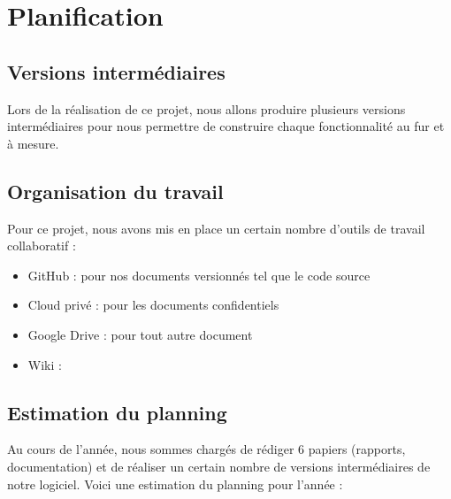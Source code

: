 \section{Planification}
\subsection{Versions intermédiaires}
Lors de la réalisation de ce projet, nous allons produire plusieurs versions intermédiaires pour nous permettre de construire chaque fonctionnalité au fur et à mesure.
\subsection{Organisation du travail}
Pour ce projet, nous avons mis en place un certain nombre d'outils de travail collaboratif :

\begin{itemize}
  \item GitHub : pour nos documents versionnés tel que le code source
  \item Cloud privé : pour les documents confidentiels
  \item Google Drive : pour tout autre document
  \item Wiki : 
\end{itemize}


\subsection{Estimation du planning}
Au cours de l'année, nous sommes chargés de rédiger 6 papiers (rapports, documentation) et de réaliser un certain nombre de versions intermédiaires de notre logiciel.
Voici une estimation du planning pour l'année :

